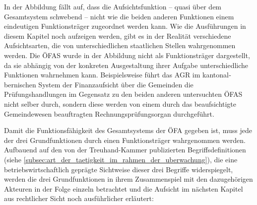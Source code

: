 \documentclass[10pt]{article}
\begin{document}
In der Abbildung fällt auf, dass die Aufsichtsfunktion -- quasi über dem Gesamtsystem schwebend -- nicht wie die beiden anderen Funktionen einem eindeutigen Funktionsträger zugeordnet werden kann. Wie die Ausführungen in diesem Kapitel noch aufzeigen werden, gibt es in der Realität verschiedene Aufsichtsarten, die von unterschiedlichen staatlichen Stellen wahrge­nommen werden. Die ÖFAS wurde in der Abbildung nicht als Funktionsträger dargestellt, da sie abhängig von der konkreten Ausgestaltung ihrer Aufgabe unter­schiedliche Funktionen wahr­nehmen kann. Beispielsweise führt das AGR im kantonal­bernischen System der Finanzaufsicht über die Gemeinden die Prüfungshandlungen im Gegen­satz zu den beiden anderen untersuchten ÖFAS nicht selber durch, sondern diese werden von einem durch das beaufsichtigte Gemeindewesen beauftragten Rechnungs­prüfungsorgan durch­geführt.

Damit die Funktionsfähigkeit des Gesamtsystems der ÖFA gegeben ist, muss jede der drei Grundfunktionen durch einen Funktionsträger wahrgenommen werden. Aufbauend auf den von der Treuhand-Kammer publizierten Begriffsdefinitionen (siehe \vref{subsec:art_der_taetigkeit_im_rahmen_der_uberwachung}), die eine betriebswirtschaftlich geprägte Sichtweise dieser drei Begriffe wider­spiegelt, werden die drei Grundfunktionen in ihrem Zusammenspiel mit den dazu­ge­hörigen Akteuren in der Folge einzeln betrachtet und die Aufsicht im nächsten Kapitel aus rechtlicher Sicht noch ausführlicher erläutert:
\end{document}
